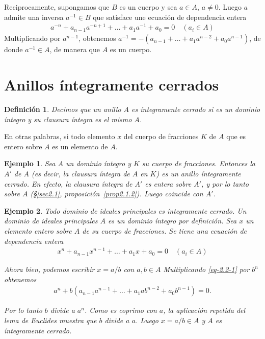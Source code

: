 \documentclass[bibtotoc,leqno,spanish]{amsbook}
\let\emph\relax %
\numberwithin{equation}{section}
\theoremstyle{note}
\newtheorem*{definition*}{Definici\'on}
\theoremstyle{note}
\theoremstyle{rem}
\newtheorem{example}{Ejemplo}
\numberwithin{theorem}{section}
\numberwithin{proposition}{section}
\numberwithin{definition}{section}
\numberwithin{lemma}{section}
\numberwithin{corollary}{section}
\numberwithin{example}{section}
\numberwithin{footnote}{section}%
\begin{document}
Reciprocamente, supongamos que $B$ es un cuerpo y sea $a\in A$, $a\neq 0$. Luego $a$ admite una inversa
$a^{-1}\in B$ que satisface une ecuaci\'on de dependencia entera
\begin{gather*}
a^{-n}+a_{n-1}a^{-n+1}+\dots+a_{1}a^{-1}+a_{0} =0\quad(a_{i}\in A)
\end{gather*}
Multiplicando por $a^{n-1}$, obtenemos $a^{-1}=-(a_{n-1}+\dots+a_{1}a^{n-2}+a_{0}a^{n-1})$, de donde
$a^{-1}\in A$, de manera que $A$ es un cuerpo.

\section{Anillos \'integramente cerrados}\label{sec2.2}

\begin{definition*}
Decimos que un anillo $A$ es \'integramente cerrado si es un dominio \'integro y su clausura \'integra es
el mismo $A$.
\end{definition*}

En otras palabras, si todo elemento $x$ del cuerpo de fracciones $K$ de $A$ que es entero sobre $A$
es un elemento de $A$.

\begin{example}
Sea $A$ un dominio \'integro y $K$ su cuerpo de fracciones. Entonces la \emph{clausura \'integra} $A'$
de $A$ (es decir, la clausura \'integra de $A$ en $K$) es un anillo \'integramente cerrado. En efecto, la
clausura \'integra de $A'$ es entera sobre $A'$, y por lo tanto sobre $A$ (\S\ref{sec2.1}, proposici\'on~\ref{prop2.1.2}).
Luego coincide con $A'$.
\end{example}

\begin{example}{\itshape Todo dominio de ideales principales es \'integramente cerrado.}
Un dominio de ideales principales $A$ es un dominio \'integro por definici\'on. Sea $x$
un elemento entero sobre $A$ de su cuerpo de fracciones. Se tiene una ecuaci\'on de dependencia
entera
\begin{gather}\label{eq-2.2-1}
x^{n}+a_{n-1}x^{n-1}+\dots+a_{1}x+a_{0}=0\quad(a_{i}\in A)
\end{gather}

Ahora bien, podemos escribir $x = a/b$ con $a,b\in A$ \emph{coprimos.} Multiplicando \eqref{eq-2.2-1}
por $b^{n}$ obtenemos
\begin{gather*}
a^{n}+b(a_{n-1}a^{n-1}+\dots+a_{1}ab^{n-2}+a_{0}b^{n-1}) = 0.
\end{gather*}

Por lo tanto $b$ divide a $a^{n}$. Como es coprimo con $a$, la aplicaci\'on repetida del lema de Euclides
muestra que $b$ divide a $a$. Luego $x = a/b\in A$ y $A$ es \'integramente cerrado.
\end{example}
\end{document}
